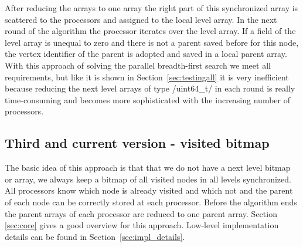 \documentclass[12pt,a4paper]{article}
\begin{document}
After reducing the arrays to one array the right part of this synchronized array is scattered to the processors and assigned to the local level array. In the next round of the algorithm the processor iterates over the level array. If a field of the level array is unequal to zero and there is not a parent saved before for this node, the vertex identifier of the parent is adopted and saved in a local parent array.\\
With this approach of solving the parallel breadth-first search we meet all requirements, but like it is shown in Section~\ref{sec:testingall} it is very inefficient because reducing the next level arrays of type \cinline/uint64_t/ in each round is really time-consuming and becomes more sophisticated with the increasing number of processors.

\subsection{Third and current version - visited bitmap}
\label{sec:thirdversion}

The basic idea of this approach is that that we do not have a next level bitmap or array, we always keep a bitmap of all visited nodes in all levels synchronized. All processors know which node is already visited and which not and the parent of each node can be correctly stored at each processor. Before the algorithm ends the parent arrays of each processor are reduced to one parent array. Section \ref{sec:core} gives a good overview for this approach. Low-level implementation details can be found in Section~\ref{sec:impl_details}.
\end{document}
